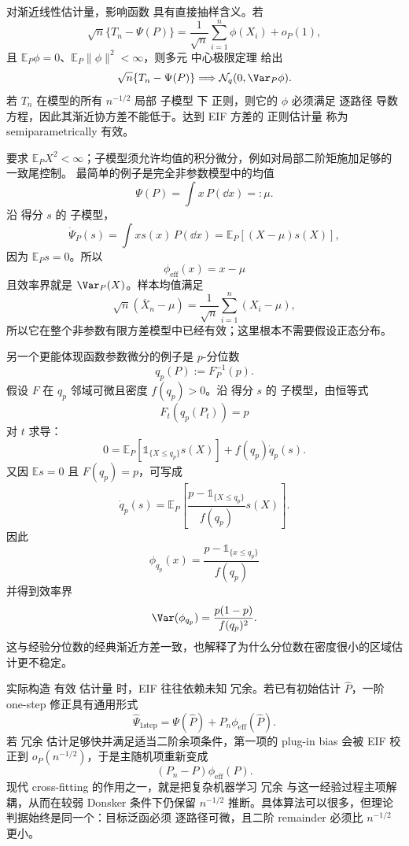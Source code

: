 \begin{proposition}[渐近线性估计的抽样含义]
对渐近线性估计量，影响函数 具有直接抽样含义。若
\begin{equation*}\sqrt n\{T_n-\Psi(P)\}
=
\frac1{\sqrt n}
\sum_{i=1}^n\phi(X_i)
+o_P(1),\end{equation*}
且 $\mathbb E_P\phi=0$、$\mathbb E_P\|\phi\|^2<\infty$，则多元 中心极限定理 给出
\[
\sqrt n\{T_n-\Psi(P)\}
\Longrightarrow
\mathcal N_q(0,\Var_P\phi).
\]
若 $T_n$ 在模型的所有 $n^{-1/2}$ 局部 子模型 下 正则，则它的 $\phi$ 必须满足 逐路径 导数 方程，因此其渐近协方差不能低于。达到 EIF 方差的 正则估计量 称为 semiparametrically 有效。
\end{proposition}

\begin{workedexample}[均值的有效影响函数]
要求 $\mathbb E_PX^2<\infty$；子模型须允许均值的积分微分，例如对局部二阶矩施加足够的一致尾控制。
最简单的例子是完全非参数模型中的均值
\[
\Psi(P)=\int x\,P(\dd x)=:\mu.
\]
沿 得分 $s$ 的 子模型，
\[
\dot\Psi_P(s)
=\int x s(x)\,P(\dd x)
=\mathbb E_P[(X-\mu)s(X)],
\]
因为 $\mathbb E_Ps=0$。所以
\[
\boxed{
\phi_{\mathrm{eff}}(x)=x-\mu
}
\]
且效率界就是 $\Var_P(X)$。样本均值满足
\[
\sqrt n(\overline X_n-\mu)
=\frac1{\sqrt n}\sum_{i=1}^n(X_i-\mu),
\]
所以它在整个非参数有限方差模型中已经有效；这里根本不需要假设正态分布。
\end{workedexample}

\begin{workedexample}[分位数的有效影响函数]
另一个更能体现函数参数微分的例子是 $p$-分位数
\[
q_p(P):=F_P^{-1}(p).
\]
假设 $F$ 在 $q_p$ 邻域可微且密度 $f(q_p)>0$。沿 得分 $s$ 的 子模型，由恒等式
\[
F_t(q_p(P_t))=p
\]
对 $t$ 求导：
\[
0
=
\mathbb E_P[\mathds{1}_{\{X\le q_p\}}s(X)]
+f(q_p)\dot q_p(s).
\]
又因 $\mathbb E s=0$ 且 $F(q_p)=p$，可写成
\[
\dot q_p(s)
=
\mathbb E_P\left[
\frac{p-\mathds{1}_{\{X\le q_p\}}}{f(q_p)}s(X)
\right].
\]
因此
\begin{equation*}\boxed{
\phi_{q_p}(x)
=
\frac{p-\mathds{1}_{\{x\le q_p\}}}{f(q_p)}
}\end{equation*}
并得到效率界
\[
\Var(\phi_{q_p})
=
\frac{p(1-p)}{f(q_p)^2}.
\]
这与经验分位数的经典渐近方差一致，也解释了为什么分位数在密度很小的区域估计更不稳定。
\end{workedexample}

\begin{note}[一步修正与二阶余项]
实际构造 有效 估计量 时，EIF 往往依赖未知 冗余。若已有初始估计 $\widehat P$，一阶 one-step 修正具有通用形式
\begin{equation*}\boxed{
\widehat\Psi_{\mathrm{1step}}
=
\Psi(\widehat P)
+P_n\phi_{\mathrm{eff}}(\widehat P)
}.\end{equation*}
若 冗余 估计足够快并满足适当二阶余项条件，第一项的 plug-in bias 会被 EIF 校正到 $o_P(n^{-1/2})$，于是主随机项重新变成
\[
(P_n-P)\phi_{\mathrm{eff}}(P).
\]
现代 cross-fitting 的作用之一，就是把复杂机器学习 冗余 与这一经验过程主项解耦，从而在较弱 Donsker 条件下仍保留 $n^{-1/2}$ 推断。具体算法可以很多，但理论判据始终是同一个：目标泛函必须 逐路径可微，且二阶 remainder 必须比 $n^{-1/2}$ 更小。
\end{note}

